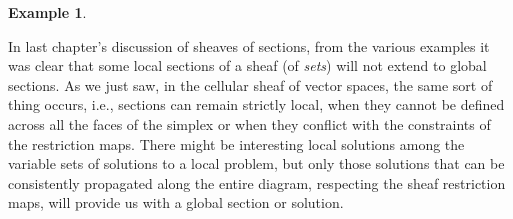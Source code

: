 \documentclass[a4paper]{book}
\theoremstyle{definition}
\newtheorem{example}{Example}[section]
\theoremstyle{definition}
\theoremstyle{definition}
\theoremstyle{theorem}
\theoremstyle{definition}
\begin{document}
\begin{example}
\begin{center}
\begin{tikzpicture}[yscale=1.6, xscale=1.38]
		\end{tikzpicture} 
		\end{center} \par \noindent 
		In last chapter's discussion of sheaves of sections, from the various examples it was clear that some local sections of a sheaf (of \textit{sets}) will not extend to global sections. As we just saw, in the cellular sheaf of vector spaces, the same sort of thing occurs, i.e., sections can remain strictly local, when they cannot be defined across all the faces of the simplex or when they conflict with the constraints of the restriction maps. There might be interesting local solutions among the variable sets of solutions to a local problem, but only those solutions that can be consistently propagated along the entire diagram, respecting the sheaf restriction maps, will provide us with a global section or solution.
	\end{example}
\end{document}

